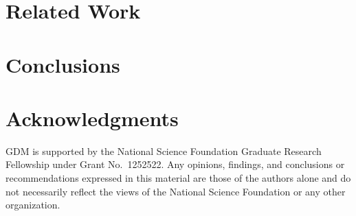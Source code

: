 \documentclass{article}
\begin{document}
\section{Related Work}

\section{Conclusions}


\section*{Acknowledgments}
GDM is supported by the National Science Foundation Graduate Research Fellowship under Grant No.\ 1252522. 
Any opinions, findings, and conclusions or recommendations expressed in this material are those of the authors alone and do not necessarily
reflect the views of the National Science Foundation or any other organization.


\end{document}
